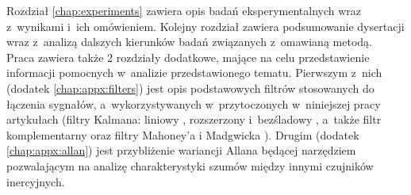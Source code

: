Rozdział \ref{chap:experiments} zawiera opis badań eksperymentalnych wraz z~wynikami i~ich omówieniem. Kolejny rozdział zawiera podsumowanie dysertacji wraz z~analizą dalszych kierunków badań związanych z~omawianą metodą.\\

Praca zawiera także 2 rozdziały dodatkowe, mające na celu przedstawienie informacji pomocnych w~analizie przedstawionego tematu. Pierwszym z~nich (dodatek \ref{chap:appx:filters}) jest opis podstawowych filtrów stosowanych do łączenia sygnałów, a~wykorzystywanych w~przytoczonych w~niniejszej pracy artykułach (filtry Kalmana: liniowy \cite{Kalman1960}, rozszerzony \cite{smith1962application} i~bezśladowy \cite{Julier1995}, a~także filtr komplementarny \cite{Euston2008} oraz filtry Mahoney'a \cite{Baldwin2007} i Madgwicka \cite{Madgwick2010}). Drugim (dodatek \ref{chap:appx:allan}) jest przybliżenie wariancji Allana \cite{Allan1966}  będącej narzędziem pozwalającym na analizę charakterystyki szumów między innymi czujników inercyjnych.